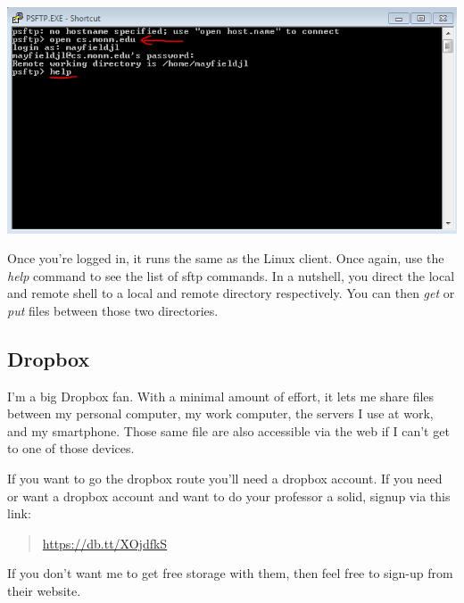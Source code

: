\documentclass[nobib]{tufte-handout}
\begin{document}
\vspace{.1in}
\begin{center}
\includegraphics[scale=.75]{PSFTP-loginAndHelp.png}
\end{center}
\vspace{.1in}

Once you're logged in, it runs the same as the Linux client. Once again, use the \textit{help} command to see the list of sftp commands. In a nutshell, you direct the local and remote shell to a local and remote directory respectively. You can then \textit{get} or \textit{put} files between those two directories.

\subsection{Dropbox}

I'm a big Dropbox fan. With a minimal amount of effort, it lets me share files between my personal computer, my work computer, the servers I use at work, and my smartphone.  Those same file are also accessible via the web if I can't get to one of those devices.

If you want to go the dropbox route you'll need a dropbox account. If you need or want a dropbox account and want to do your professor a solid, signup via this link:
\begin{quote}
\url{https://db.tt/XOjdfkS}
\end{quote}
If you don't want me to get free storage with them, then feel free to sign-up from their website.
\end{document}
